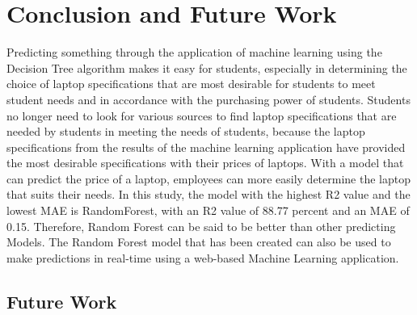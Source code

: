\documentclass[
11pt, %
english, %
singlespacing, %
headsepline, %
]{MastersDoctoralThesis} %
\begin{document}
\chapter{Conclusion and Future Work}
\begin{justify}
Predicting something through the application of machine learning using the Decision Tree algorithm makes it easy for students, especially in determining the choice of laptop specifications that are most desirable for students to meet student needs and in accordance with the purchasing power of students. Students no longer need to look for various sources to find laptop specifications that are needed by students in meeting the needs of students, because the laptop specifications from the results of the machine learning application have provided the most desirable specifications with their prices of laptops. With a model that can predict the price of a laptop, employees can more easily determine the laptop that suits their needs. In this study, the model with the highest R2 value and the lowest MAE is RandomForest, with an R2 value of 88.77 percent and an MAE of 0.15. Therefore, Random Forest can be said
to be better than other predicting Models. The Random Forest model that has been created can also be used to make predictions in real-time using a web-based Machine Learning application.
\end{justify}
% 
% 
\begin{flushleft}
    \section{Future Work}
\end{flushleft}
\end{document}
